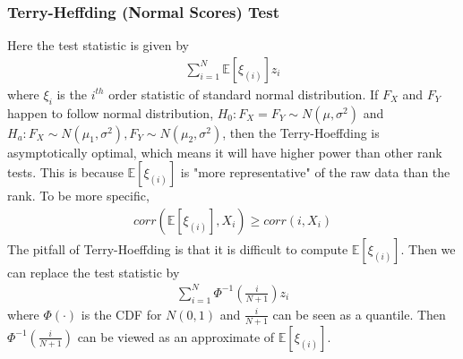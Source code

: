 \documentclass[twoside]{article}
\begin{document}
	\subsubsection{Terry-Heffding (Normal Scores) Test}
	Here the test statistic is given by 
	\begin{align*}
		\sum_{i=1}^{N} \mathbb{E} \left[ \xi_{(i)} \right] z_i
	\end{align*}
	where $\xi_i$ is the $i^{th}$ order statistic of standard normal distribution. If $F_X$ and $F_Y$ happen to follow normal distribution, $H_0: F_X= F_Y \sim N(\mu, \sigma^2)$ and $H_a: F_X \sim N(\mu_1, \sigma^2), F_Y \sim N(\mu_2, \sigma^2)$, then the Terry-Hoeffding is asymptotically optimal, which means it will have higher power than other rank tests. This is because $\mathbb{E} \left[ \xi_{(i)} \right]$ is "more representative" of the raw data than the rank. To be more specific, 
	\begin{align*}
		corr \left( \mathbb{E} \left[ \xi_{(i)} \right], X_i \right) \geqslant corr \left( i, X_i \right)
	\end{align*}
	The pitfall of Terry-Hoeffding is that it is difficult to compute $\mathbb{E} \left[ \xi_{(i)} \right]$. Then we can replace the test statistic by
	\begin{align*}
		\sum_{i=1}^{N} \Phi^{-1} \left( \frac{i}{N+1} \right) z_i
	\end{align*}
	where $\Phi(\cdot)$ is the CDF for $N(0,1)$ and $\frac{i}{N+1}$ can be seen as a quantile. Then $\Phi^{-1} \left( \frac{i}{N+1} \right)$ can be viewed as an approximate of $\mathbb{E} \left[ \xi_{(i)} \right]$. 
	
\end{document}
